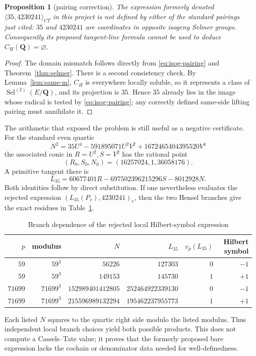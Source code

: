 \documentclass[11pt]{article}
\newtheorem{proposition}[theorem]{Proposition}
\newcommand{\Q}{\mathbf Q}
\newcommand{\Sel}{\operatorname{Sel}}
\begin{document}
\begin{proposition}[pairing correction]\label{prop:correction}
The expression formerly denoted
$\langle35,4230241\rangle_{CT}$ in this project is not defined by either
of the standard pairings just cited: $35$ and $4230241$ are coordinates in
opposite isogeny Selmer groups.  Consequently its proposed tangent-line
formula cannot be used to deduce $C_H(\Q)=\varnothing$.
\end{proposition}
\begin{proof}
The domain mismatch follows directly from \eqref{eq:isog-pairing} and
Theorem~\ref{thm:selmer}.  There is a second consistency check.  By
Lemma~\ref{lem:same-m}, $C_H$ is everywhere locally soluble, so it represents a class of
$\Sel^{(2)}(E/\Q)$, and its projection is $35$.  Hence $35$ already lies in
the image whose radical is tested by \eqref{eq:isog-pairing}; any correctly
defined same-side lifting pairing must annihilate it.
\end{proof}

The arithmetic that exposed the problem is still useful as a negative
certificate.  For the standard even quartic
\[
 N^2=35U^4-591895071U^2V^2+1672465404395520V^4
\]
the associated conic in $R=U^2,S=V^2$ has the rational point
\[
 (R_0,S_0,N_0)=(16257024,1,36058176).
\]
A primitive tangent there is
\[
 L_{35}=60677401R-697502396215296S-8012928N.
\]
Both identities follow by direct substitution.  If one nevertheless
evaluates the rejected expression $(L_{35}(P_v),4230241)_v$, then the two
Hensel branches give the exact residues in
Table~\ref{tab:rejected-hilbert}.

\begin{table}[ht]
\centering
\caption{Branch dependence of the rejected local Hilbert-symbol expression}
\label{tab:rejected-hilbert}
\begin{tabular}{rrrrrr}
\toprule
$p$ & modulus & $N$ & $L_{35}$ & $v_p(L_{35})$ & Hilbert symbol\\
\midrule
$59$ & $59^3$ & $56226$ & $127303$ & $0$ & $-1$\\
$59$ & $59^3$ & $149153$ & $145730$ & $1$ & $+1$\\
$71699$ & $71699^3$ & $152989401412805$ & $252464922339130$ & $0$ & $-1$\\
$71699$ & $71699^3$ & $215596989132294$ & $195462237955773$ & $1$ & $+1$\\
\bottomrule
\end{tabular}
\end{table}
Each listed $N$ squares to the quartic right side modulo the listed modulus.
Thus independent local branch choices yield both possible products.  This
does not compute a Cassels--Tate value; it proves that the formerly proposed
bare expression lacks the cochain or denominator data needed for
well-definedness.
\end{document}
